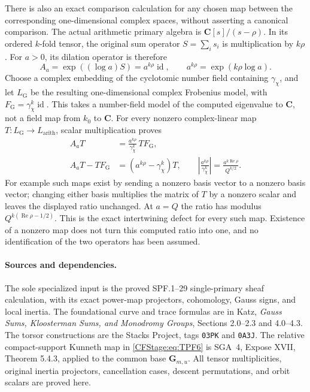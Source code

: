 There is also an exact comparison calculation
for any chosen map between the corresponding
one-dimensional complex spaces, without
asserting a canonical comparison.
The actual arithmetic primary algebra is
\(\mathbf C[s]/(s-\rho)\). In its ordered
\(k\)-fold tensor, the original sum operator
\(S=\sum_i s_i\) is multiplication by \(k\rho\).
For \(a>0\), its dilation operator is therefore
\[
 A_a=\exp((\log a)S)=a^{k\rho}\operatorname{id},
 \qquad a^{k\rho}=\exp(k\rho\log a).
 \tag{TPF.54}\label{CFStage:eq:TPF54}
\]
Choose a complex embedding of the cyclotomic
number field containing \(\gamma_\chi\),
and let \(L_{\mathrm{G}}\) be the resulting
one-dimensional complex Frobenius model,
with \(F_{\mathrm G}=\gamma_\chi^k\operatorname{id}\).
This takes a number-field model of the
computed eigenvalue to \(\mathbf C\), not
a field map from \(k_0\) to \(\mathbf C\).
For every nonzero complex-linear map
\(T:L_{\mathrm G}\to L_{\mathrm{arith}}\),
scalar multiplication proves
\[
 \begin{split}
 A_aT
    &=\frac{a^{k\rho}}{\gamma_\chi^k}\,TF_{\mathrm G},\\
 A_aT-TF_{\mathrm G}
    &=(a^{k\rho}-\gamma_\chi^k)T,\qquad
 \left|\frac{a^{k\rho}}{\gamma_\chi^k}\right|
       =\frac{a^{k\operatorname{Re}\rho}}{Q^{k/2}} .
 \end{split}
 \tag{TPF.55}\label{CFStage:eq:TPF55}
\]
For example such maps exist by sending a
nonzero basis vector to a nonzero basis
vector; changing either basis multiplies
the matrix of \(T\) by a nonzero scalar
and leaves the displayed ratio unchanged.
At \(a=Q\) the ratio has modulus
\(Q^{k(\operatorname{Re}\rho-1/2)}\).
This is the exact intertwining defect for
every such map. Existence of a nonzero
map does not turn this computed ratio
into one, and no identification of the
two operators has been assumed.

\paragraph{Sources and dependencies.}
The sole specialized input is the proved SPF.1--29
single-primary sheaf calculation, with its exact
power-map projectors, cohomology, Gauss signs,
and local inertia. The foundational curve and
trace formulas are in Katz,
\emph{Gauss Sums, Kloosterman Sums, and Monodromy
Groups}, Sections 2.0--2.3 and 4.0--4.3.
The torsor constructions are the Stacks Project,
tags \texttt{03PK} and \texttt{0A3J}. The relative
compact-support Kunneth map in
\eqref{CFStage:eq:TPF6} is SGA~4, Expose XVII,
Theorem 5.4.3, applied to the common base
\(\mathbf G_{m,u}\). All
tensor multiplicities, original inertia
projectors, cancellation cases, descent
permutations, and orbit scalars are proved here.

